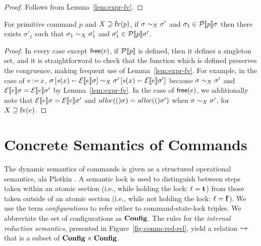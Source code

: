 \documentclass[11pt]{report}
\begin{document}
\begin{proof}
	Follows from Lemma~\ref{lem:expr-fv}. 
\end{proof}

\begin{lemma}\label{lem:pcomm-fv-step}
	For primitive command $p$ and $X \supseteq \mathrm{fv}(p)$, if $\sigma \sim_{X} \sigma'$ and $\sigma_1 \in \mathcal{P}[\![p]\!]\sigma$ then there exists $\sigma'_1$  such that $\sigma_1 \sim_{X} \sigma_1'$ and $\sigma'_1 \in \mathcal{P}[\![p]\!]\sigma'$.
\end{lemma}

\begin{proof}
	In every case except $\operatorname{\mathsf{free}}(e)$, if $\mathcal{P}[\![p]\!]$ is defined, then it defines a singleton set, and it is straightforward to check that the function which is defined preserves the congruence, making frequent use of Lemma~\ref{lem:expr-fv}. For example, in the case of $e \operatorname{:\!=} x$, $\sigma \left[ s(x) \shortleftarrow \mathcal{E}[\![e]\!]\sigma \right] \sim_{X} \sigma' \left[ s(x) \shortleftarrow \mathcal{E}[\![e]\!]\sigma' \right]$ because $\sigma \sim_{X} \sigma'$ and $\mathcal{E}[\![e]\!]\sigma = \mathcal{E}[\![e]\!]\sigma'$ by Lemma~\ref{lem:expr-fv}. In the case of $\operatorname{\mathsf{free}}(e)$, we additionally note that $\mathcal{E}[\![e]\!]\sigma = \mathcal{E}[\![e]\!]\sigma'$ and $\mathit{alloc}(()\sigma) =\mathit{alloc}(()\sigma')$ when $\sigma \sim_{X} \sigma'$, for $X \supseteq \mathrm{fv}(e)$. 
\end{proof}


\section{Concrete Semantics of Commands} %
\label{sec:concrete_semantics}

The dynamic semantics of commands is given as a structured operational semantics, ala Plotkin \cite{Plotkin:NatSemTR}. A semantic lock is used to distinguish between steps taken within an atomic section (i.e., while holding the lock: $\ell = \mathbf{t}$) from those taken outside of an atomic section (i.e., while not holding the lock: $\ell = \mathbf{f}$). We use the term \emph{configurations} to refer either to command-state-lock triples. We abbreviate the set of configurations as $\mathbf{Config}$. The rules for the \emph{internal reduction semantics}, presented in Figure~\ref{fig:comm-red-rel}, yield a relation $\operatorname{\hookrightarrow}$ that is a subset of $\mathbf{Config} \times \mathbf{Config}$. 
\end{document}

